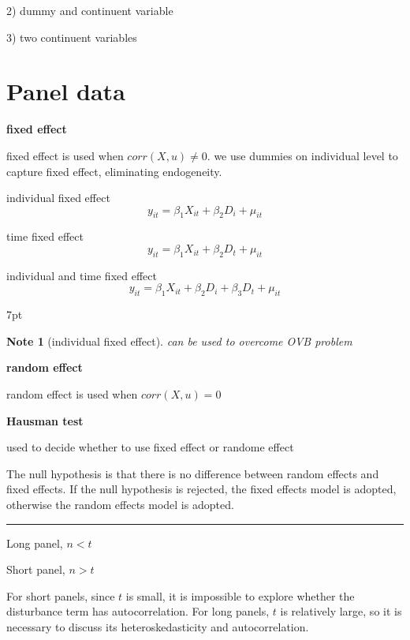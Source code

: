 \documentclass{article}
\newcommand*\sepline{%
  \begin{center}
    \rule[1ex]{.5\textwidth}{.5pt}
  \end{center}}
\newenvironment{blueblock}{
\def\FrameCommand{
  \hspace{1pt}
    {\color{DarkBlue}
    \vrule width 2pt}
    {\color{blueshade}
    \vrule width 4pt}
  \colorbox{blueshade}
}
\MakeFramed{
  \advance
  \hsize-
  \width
  \FrameRestore}
\noindent\hspace{-4.55pt}%
\begin{adjustwidth}{}{7pt}
\vspace{2pt}\vspace{2pt}
}
{\vspace{2pt}\end{adjustwidth}\endMakeFramed}
\newtheorem{note}{Note}
\begin{document}
2) dummy and continuent variable


3) two continuent variables



\section{Panel data}

\textbf{fixed effect}

fixed effect is used when $corr(X,u)\neq 0$. we use dummies on individual level to capture fixed effect, eliminating endogeneity.

individual fixed effect
\begin{equation}
  y_{it}=\beta_1 X_{it}+\beta_2D_i+\mu_{it}
\end{equation}

time fixed effect
\begin{equation}
  y_{it}=\beta_1 X_{it}+\beta_2D_t+\mu_{it}
\end{equation}

individual and time fixed effect
\begin{equation}
  y_{it}=\beta_1 X_{it}+\beta_2D_i+\beta_3D_t+\mu_{it}
\end{equation}


\begin{blueblock}
\begin{note}[individual fixed effect]
can be used to overcome OVB problem
\end{note}
\end{blueblock}



\textbf{random effect}

random effect is used when $corr(X,u)=0$

\textbf{Hausman test}

used to decide whether to use fixed effect or randome effect

The null hypothesis is that there is no difference between random effects and fixed effects. If the null hypothesis is rejected, the fixed effects model is adopted, otherwise the random effects model is adopted.

\sepline

Long panel, $n<t$

Short panel, $n>t$

For short panels, since $t$ is small, it is impossible to explore whether the disturbance term has autocorrelation. For long panels, $t$ is relatively large, so it is necessary to discuss its heteroskedasticity and autocorrelation.
\end{document}

